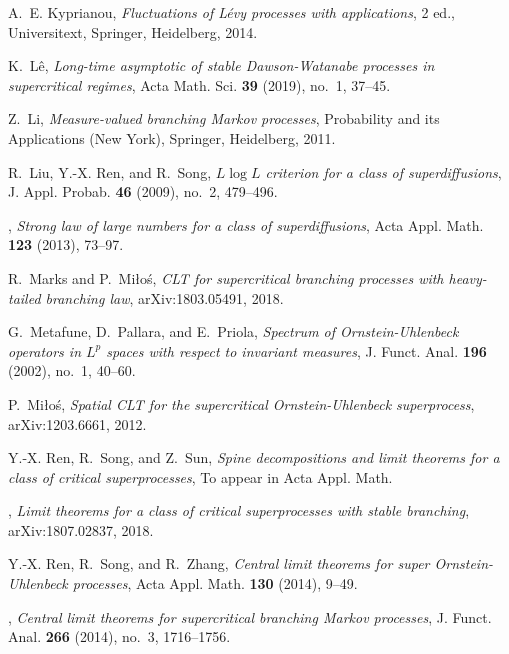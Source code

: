 \documentclass[12pt,a4paper]{amsart}
\theoremstyle{plain}
\theoremstyle{definition}
\numberwithin{equation}{section}
\begin{document}
\begin{thebibliography}{10}
A.~E. Kyprianou, \emph{Fluctuations of {L}\'{e}vy processes with applications},
  2 ed., Universitext, Springer, Heidelberg, 2014.

K.~L\^{e}, \emph{Long-time asymptotic of stable {D}awson-{W}atanabe processes
  in supercritical regimes}, Acta Math. Sci. \textbf{39} (2019), no.~1, 37--45.

Z.~Li, \emph{Measure-valued branching {M}arkov processes}, Probability and its
  Applications (New York), Springer, Heidelberg, 2011.

R.~Liu, Y.-X. Ren, and R.~Song, \emph{{$L\log L$} criterion for a class of
  superdiffusions}, J. Appl. Probab. \textbf{46} (2009), no.~2, 479--496.

\bysame, \emph{Strong law of large numbers for a
  class of superdiffusions}, Acta Appl. Math. \textbf{123} (2013), 73--97.

R.~Marks and P.~Mi{\l}o{\'s}, \emph{C{LT} for supercritical branching processes
  with heavy-tailed branching law}, arXiv:1803.05491, 2018.

G.~Metafune, D.~Pallara, and E.~Priola, \emph{Spectrum of
  {O}rnstein-{U}hlenbeck operators in {$L^p$} spaces with respect to invariant
  measures}, J. Funct. Anal. \textbf{196} (2002), no.~1, 40--60.

P.~Mi{\l}o{\'s}, \emph{Spatial {CLT} for the supercritical
  {O}rnstein-{U}hlenbeck superprocess}, arXiv:1203.6661, 2012.

Y.-X. Ren, R.~Song, and Z.~Sun, \emph{Spine decompositions and limit theorems
  for a class of critical superprocesses}, 
  To appear in Acta Appl. Math.

\bysame, \emph{Limit theorems for a class of critical superprocesses with stable branching},
    arXiv:1807.02837, 2018.

Y.-X. Ren, R.~Song, and R.~Zhang, \emph{Central limit theorems for super
  {O}rnstein-{U}hlenbeck processes}, Acta Appl. Math. \textbf{130} (2014),
  9--49.

\bysame, \emph{Central limit theorems for supercritical branching {M}arkov
  processes}, J. Funct. Anal. \textbf{266} (2014), no.~3, 1716--1756.


\end{thebibliography}
\end{document}
